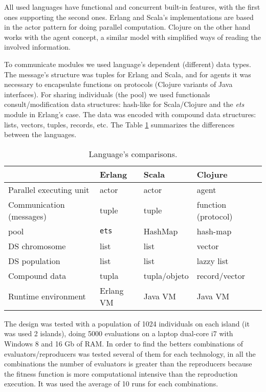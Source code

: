 
All used languages have functional and concurrent built-in features, with the first ones supporting the second ones. Erlang and Scala’s implementations are based in the actor pattern for doing parallel computation. Clojure on the other hand works with the agent concept, a similar model with simplified ways of reading the involved information.

To communicate modules we used language’s dependent (different) data types. The message's structure was tuples for Erlang and Scala, and for agents it was necessary to encapsulate functions on protocols (Clojure variants of Java interfaces). For sharing individuals (the pool) we used functionals consult/modification data structures: hash-like for Scala/Clojure and the {\em ets} module in Erlang’s case. The data was encoded with compound data structures: lists, vectors, tuples, records, etc. The Table \ref{tb:res:comp} summarizes the differences between the languages.

\begin{table}
  \caption{Language's comparisons.}\label{tb:res:comp}
  \centering
  \begin{tabular}{|p{4cm}|>{\centering}p{3cm}|>{\centering}p{3cm}|>{\centering}p{3cm}|}
    \hline
     & \textbf{Erlang} & \textbf{Scala} & \textbf{Clojure} \tabularnewline
    \hline
    Parallel executing unit & actor & actor & agent \tabularnewline
    \hline
    Communication (messages) & tuple & tuple & function (protocol) \tabularnewline
    \hline
    pool & \texttt{ets} & HashMap & hash-map \tabularnewline
    \hline
    DS chromosome & list & list & vector \tabularnewline
    \hline
    DS population & list & list & lazzy list \tabularnewline
    \hline
    Compound data & tupla & tupla/objeto & record/vector \tabularnewline
    \hline
    Runtime environment & Erlang VM & Java VM & Java VM \tabularnewline
    \hline
  \end{tabular}

\end{table}



The design was tested with a population of 1024 individuals on each island (it was used 2 islands), doing 5000 evaluations on a laptop dual-core i7 with Windows 8 and 16 Gb of RAM. In order to find the betters combinations of evaluators/reproducers was tested several of them for each technology, in all the combinations the number of evaluators is greater than the reproducers because the fitness function is more computational intensive than the reproduction execution. It was used the average of 10 runs for each combinations.

